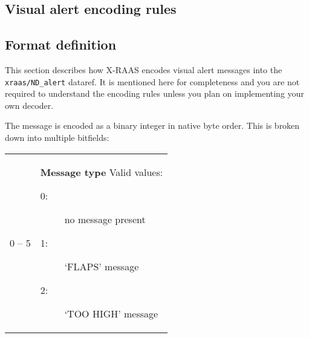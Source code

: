 \documentclass[a4paper,12pt]{article}
\newcommand{\dataref}[1]{\texttt{#1}}
\begin{document}
\newpage
\begin{appendix}

\section{Visual alert encoding rules}
\label{app:EncodingRules}

\subsection{Format definition}

This section describes how X-RAAS encodes visual alert messages into the
\dataref{xraas/ND\_alert} dataref. It is mentioned here for completeness
and you are not required to understand the encoding rules unless you plan
on implementing your own decoder.

The message is encoded as a binary integer in native byte order. This is
broken down into multiple bitfields:

{\small
\begin{center}




\tablelasttail{\hline}

\begin{supertabular}{|c|p{13.5cm}|}

0 -- 5 &
\textbf{Message type}\newline
Valid values:

\begin{description}

\item[0:] no message present

\item[1:] `FLAPS' message

\item[2:] `TOO HIGH' message


\end{description}
\end{supertabular}
\end{center}}
\end{appendix}
\end{document}
